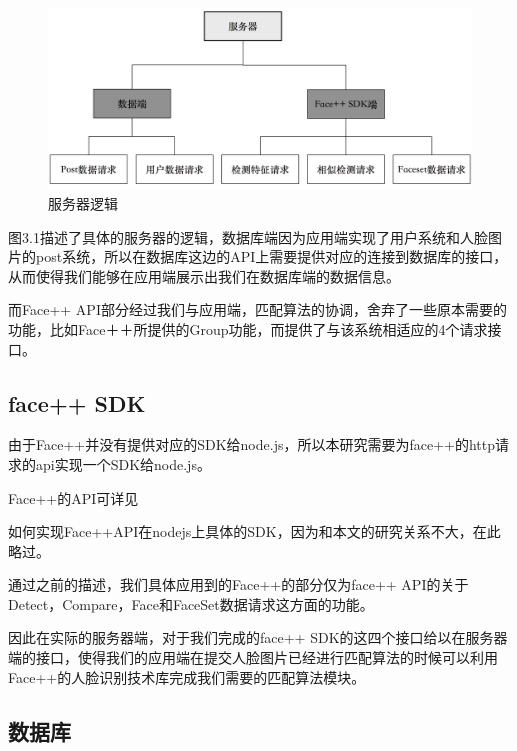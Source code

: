 \begin{figure}[h]
\centering
\includegraphics[width=\textwidth]{img/chap3/server.png}
\caption{服务器逻辑\label{Face++API}}
\end{figure}
 
图3.1描述了具体的服务器的逻辑，数据库端因为应用端实现了用户系统和人脸图片的post系统，所以在数据库这边的API上需要提供对应的连接到数据库的接口，从而使得我们能够在应用端展示出我们在数据库端的数据信息。

而Face++ API部分经过我们与应用端，匹配算法的协调，舍弃了一些原本需要的功能，比如Face＋＋所提供的Group功能，而提供了与该系统相适应的4个请求接口。


\subsection{face++ SDK}
由于Face++并没有提供对应的SDK给node.js，所以本研究需要为face++的http请求的api实现一个SDK给node.js。

Face++的API可详见\parencite{face}

如何实现Face++API在nodejs上具体的SDK，因为和本文的研究关系不大，在此略过。

通过之前的描述，我们具体应用到的Face++的部分仅为face++ API的关于Detect，Compare，Face和FaceSet数据请求这方面的功能。

因此在实际的服务器端，对于我们完成的face++ SDK的这四个接口给以在服务器端的接口，使得我们的应用端在提交人脸图片已经进行匹配算法的时候可以利用Face++的人脸识别技术库完成我们需要的匹配算法模块。


\subsection{数据库}

